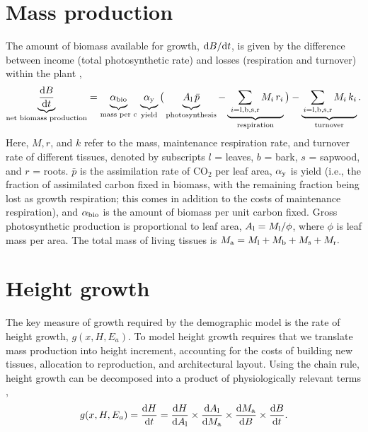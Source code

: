 \documentclass[10pt,twoside]{article}
\begin{document}
\section{Mass production}\label{standard-model-for-mass-production}

The amount of biomass available for growth,
\({\rm d}B  / {\rm d}t\), is given by the difference between income
(total photosynthetic rate) and losses (respiration and turnover) within the
plant \citep{Makela-1997, Thornley-2000, Falster-2011},
\begin{equation}\label{eq:dbdt}
\underbrace{\strut \frac{{\rm d}B}{{\rm d}t}}_\textrm{net biomass production}
= \underbrace{\strut \alpha_{\rm bio} }_\textrm{mass per c} \,
\underbrace{\strut \alpha_{\rm y} }_\textrm{yield}
\big( \underbrace{\strut A_{\rm l} \, \bar{p}}_\textrm{photosynthesis} -
\underbrace{\strut \, \sum_{i = {\rm l}, {\rm b}, {\rm s}, {\rm r}}{M_i \, r_i}}_\textrm{respiration}\big)
- \underbrace{\strut \sum_{i = {\rm l}, {\rm b}, {\rm s},  {\rm r}}{M_i \, k_i}}_\textrm{turnover}.
\end{equation}
Here, \(M, r\), and \(k\) refer to the mass, maintenance respiration rate, and
turnover rate of different tissues, denoted by subscripts \(l\) = leaves,
\(b\) = bark, \(s\) = sapwood, and \(r\) = roots. \(\bar{p}\) is the assimilation
rate of CO\(_2\) per leaf area, \(\alpha_{\rm y}\) is yield (i.e., the fraction of
assimilated carbon fixed in biomass, with the remaining fraction being lost
as growth respiration; this comes in addition
to the costs of maintenance respiration), and \(\alpha_{\rm bio}\) is the amount of biomass per unit carbon fixed. Gross photosynthetic production is proportional to leaf area,
\(A_{\rm l} = M_{\rm l} / \phi\), where \(\phi\) is leaf mass per
area. The total mass of living tissues is
\(M_{\rm a} = M_{\rm l} + M_{\rm b} + M_{\rm s} + M_{\rm r}.\)

\section{Height growth}\label{height-growth-rate}

The key measure of growth required by the demographic model is the
rate of height growth, $g(x, H, E_{a})$. To model height growth
requires that we translate mass
production into height increment, accounting for the costs of
building new tissues, allocation
to reproduction, and architectural layout. Using the chain rule, height growth
can be decomposed into a product of physiologically relevant terms
\citep{Falster-2011},
\begin{equation} \label{eq:dhdt}
g(x, H, E_{a}) = \frac{{\rm d}H}{{\rm d}t} = \frac{{\rm d}H}{{\rm d}A_{\rm l}}
\times \frac{{\rm d}A_{\rm l} }{{\rm d}M_{\rm a}}
\times \frac{{\rm d}M_{\rm a}}{{\rm d}B}
\times \frac{{\rm d}B}{{\rm d}t}.
\end{equation}
\end{document}
